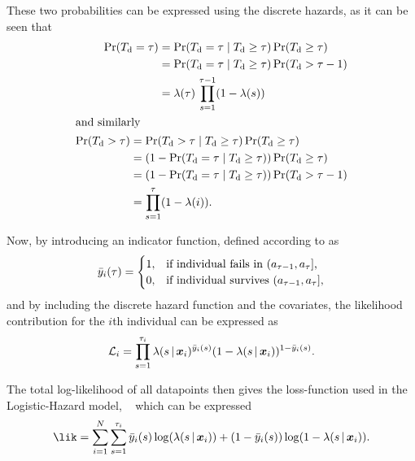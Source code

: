 These two probabilities can be expressed using the discrete hazards,
as it can be seen that
\begin{align}
    \begin{split}
    \operatorname{\Pr} ({T_{\mathrm{d}}} = \tau) 
    &= \operatorname{\Pr} ({T_{\mathrm{d}}} = \tau \mid {T_{\mathrm{d}}} \geq \tau) \operatorname{\Pr} ({T_{\mathrm{d}}}  \geq \tau) \\
    &= \operatorname{\Pr} ({T_{\mathrm{d}}} = \tau \mid {T_{\mathrm{d}}} \geq \tau) \operatorname{\Pr} ({T_{\mathrm{d}}}  > \tau - 1) \\
    &= \lambda (\tau) \, \prod_{s=1}^{\tau - 1} (1 - \lambda(s))
    \end{split} \\
    \intertext{and similarly}
    \begin{split}
    \operatorname{\Pr} ({T_{\mathrm{d}}} > \tau) 
        &= \operatorname{\Pr} ({T_{\mathrm{d}}} > \tau \mid {T_{\mathrm{d}}} \geq \tau) \operatorname{\Pr} ({T_{\mathrm{d}}}  \geq \tau) \\
        &= (1 - \operatorname{\Pr} ({T_{\mathrm{d}}} = \tau \mid {T_{\mathrm{d}}} \geq \tau)) \operatorname{\Pr} ({T_{\mathrm{d}}}  \geq \tau) \\
        &= (1 - \operatorname{\Pr} ({T_{\mathrm{d}}} = \tau \mid {T_{\mathrm{d}}} \geq \tau)) \operatorname{\Pr} ({T_{\mathrm{d}}}  > \tau - 1) \\
        &= \prod_{s=1}^{\tau} (1 - \lambda(i)).
    \end{split}
\end{align}

Now, by introducing an indicator function, 
defined according to \textcite{tutzModeling2016} as 
\begin{equation}
    \bar{y}_i(\tau) = \begin{cases}
        1, & \text{if individual fails in \((a_{\tau-1}, a_{\tau}]\),} \\
        0, & \text{if individual survives \((a_{\tau-1}, a_{\tau}]\),}
    \end{cases}
\end{equation}
and by including the discrete hazard function and the covariates, 
the likelihood contribution for the \(i\)th individual can be expressed as
\begin{equation}
    \mathcal{L}_i = \prod_{s=1}^{\tau_i} 
        \lambda(s \,|\, \bm{x}_i)^{\bar{y}_i(s)}
        (1 - \lambda(s \,|\, \bm{x}_i))^{1 - \bar{y}_i(s)}.
\end{equation}

The total log-likelihood of all datapoints then gives the loss-function
used in the Logistic-Hazard model, 
~\autocite{gensheimerScalable2019, tutzModeling2016}
which can be expressed
\begin{equation}
    \label{eq:negloglik-single}
    \lik = 
        \sum_{i = 1}^{N} 
            \sum_{s=1}^{\tid_i} 
                \bar{y}_i(s) \log (\lambda(s\giv\vec{x}_i))
                + (1 - \bar{y}_i(s)) \log (1 - \lambda(s\giv\vec{x}_i)).
\end{equation}

